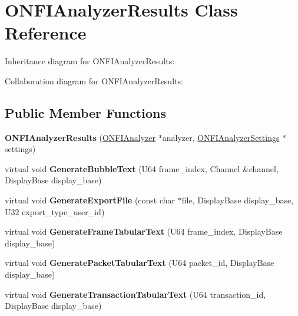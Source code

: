 \hypertarget{classONFIAnalyzerResults}{}\section{O\+N\+F\+I\+Analyzer\+Results Class Reference}
\label{classONFIAnalyzerResults}


Inheritance diagram for O\+N\+F\+I\+Analyzer\+Results\+:


Collaboration diagram for O\+N\+F\+I\+Analyzer\+Results\+:
\subsection*{Public Member Functions}
\begin{DoxyCompactItemize}
\item 
\mbox{\label{classONFIAnalyzerResults_ad0b7a655f5490bf8d1938856e112fc84}} 
{\bfseries O\+N\+F\+I\+Analyzer\+Results} (\hyperlink{classONFIAnalyzer}{O\+N\+F\+I\+Analyzer} $\ast$analyzer, \hyperlink{classONFIAnalyzerSettings}{O\+N\+F\+I\+Analyzer\+Settings} $\ast$settings)
\item 
\mbox{\label{classONFIAnalyzerResults_acd29f6cf3dd9a36987c3080e99015015}} 
virtual void {\bfseries Generate\+Bubble\+Text} (U64 frame\+\_\+index, Channel \&channel, Display\+Base display\+\_\+base)
\item 
\mbox{\label{classONFIAnalyzerResults_aacdc538673f6a9e8dfea304c568186c4}} 
virtual void {\bfseries Generate\+Export\+File} (const char $\ast$file, Display\+Base display\+\_\+base, U32 export\+\_\+type\+\_\+user\+\_\+id)
\item 
\mbox{\label{classONFIAnalyzerResults_ae42004bc8a1152a9b0f3917c6809e216}} 
virtual void {\bfseries Generate\+Frame\+Tabular\+Text} (U64 frame\+\_\+index, Display\+Base display\+\_\+base)
\item 
\mbox{\label{classONFIAnalyzerResults_aed6aaee597cf8659125d678ea19447a2}} 
virtual void {\bfseries Generate\+Packet\+Tabular\+Text} (U64 packet\+\_\+id, Display\+Base display\+\_\+base)
\item 
\mbox{\label{classONFIAnalyzerResults_a9c2a949ec9620601dd48456a74a3edf6}} 
virtual void {\bfseries Generate\+Transaction\+Tabular\+Text} (U64 transaction\+\_\+id, Display\+Base display\+\_\+base)
\end{DoxyCompactItemize}
